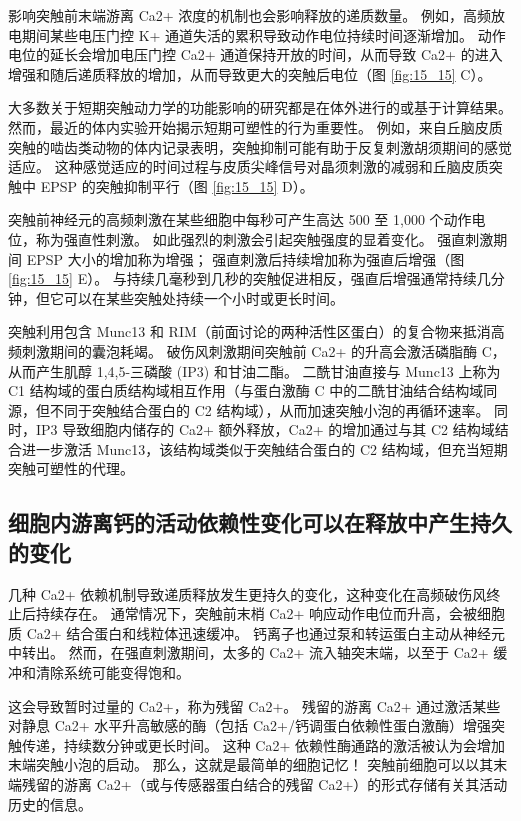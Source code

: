 影响突触前末端游离 Ca2+ 浓度的机制也会影响释放的递质数量。 
例如，高频放电期间某些电压门控 K+ 通道失活的累积导致动作电位持续时间逐渐增加。 
动作电位的延长会增加电压门控 Ca2+ 通道保持开放的时间，从而导致 Ca2+ 的进入增强和随后递质释放的增加，从而导致更大的突触后电位（图 \ref{fig:15_15} C）。


大多数关于短期突触动力学的功能影响的研究都是在体外进行的或基于计算结果。 
然而，最近的体内实验开始揭示短期可塑性的行为重要性。 
例如，来自丘脑皮质突触的啮齿类动物的体内记录表明，突触抑制可能有助于反复刺激胡须期间的感觉适应。 
这种感觉适应的时间过程与皮质尖峰信号对晶须刺激的减弱和丘脑皮质突触中 EPSP 的突触抑制平行（图 \ref{fig:15_15} D）。


突触前神经元的高频刺激在某些细胞中每秒可产生高达 500 至 1,000 个动作电位，称为强直性刺激。 
如此强烈的刺激会引起突触强度的显着变化。 强直刺激期间 EPSP 大小的增加称为增强； 强直刺激后持续增加称为强直后增强（图 \ref{fig:15_15} E）。 
与持续几毫秒到几秒的突触促进相反，强直后增强通常持续几分钟，但它可以在某些突触处持续一个小时或更长时间。


突触利用包含 Munc13 和 RIM（前面讨论的两种活性区蛋白）的复合物来抵消高频刺激期间的囊泡耗竭。 
破伤风刺激期间突触前 Ca2+ 的升高会激活磷脂酶 C，从而产生肌醇 1,4,5-三磷酸 (IP3) 和甘油二酯。 
二酰甘油直接与 Munc13 上称为 C1 结构域的蛋白质结构域相互作用（与蛋白激酶 C 中的二酰甘油结合结构域同源，但不同于突触结合蛋白的 C2 结构域），从而加速突触小泡的再循环速率。 
同时，IP3 导致细胞内储存的 Ca2+ 额外释放，Ca2+ 的增加通过与其 C2 结构域结合进一步激活 Munc13，该结构域类似于突触结合蛋白的 C2 结构域，但充当短期突触可塑性的代理。


\subsection{细胞内游离钙的活动依赖性变化可以在释放中产生持久的变化}

几种 Ca2+ 依赖机制导致递质释放发生更持久的变化，这种变化在高频破伤风终止后持续存在。 
通常情况下，突触前末梢 Ca2+ 响应动作电位而升高，会被细胞质 Ca2+ 结合蛋白和线粒体迅速缓冲。 
钙离子也通过泵和转运蛋白主动从神经元中转出。 
然而，在强直刺激期间，太多的 Ca2+ 流入轴突末端，以至于 Ca2+ 缓冲和清除系统可能变得饱和。


这会导致暂时过量的 Ca2+，称为残留 Ca2+。 
残留的游离 Ca2+ 通过激活某些对静息 Ca2+ 水平升高敏感的酶（包括 Ca2+/钙调蛋白依赖性蛋白激酶）增强突触传递，持续数分钟或更长时间。 
这种 Ca2+ 依赖性酶通路的激活被认为会增加末端突触小泡的启动。 那么，这就是最简单的细胞记忆！ 
突触前细胞可以以其末端残留的游离 Ca2+（或与传感器蛋白结合的残留 Ca2+）的形式存储有关其活动历史的信息。


